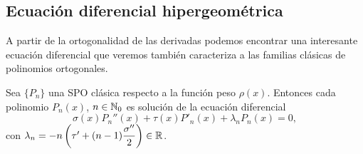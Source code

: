 \subsection{Ecuación diferencial hipergeométrica}

A partir de la ortogonalidad de las derivadas podemos encontrar una interesante ecuación diferencial que veremos también caracteriza a las familias clásicas de polinomios ortogonales.

\begin{teorema}
    \label{th:ec-hipergeometrica}
    Sea $\{P_n\}$ una SPO clásica respecto a la función peso $\rho(x)$. Entonces cada polinomio $P_n(x)$, $n\in\mathbb{N}_0$ es solución de la ecuación diferencial
    \begin{equation}
        \label{eq:ec-dif-clasicos}
        \sigma(x)P_n''(x) + \tau(x)P'_n(x)+\lambda_n P_n(x) = 0,
    \end{equation}
    con $\lambda_n = -n\left(\tau' + (n-1)\dfrac{\sigma''}{2}\right)\in\mathbb{R}$.
\end{teorema}
